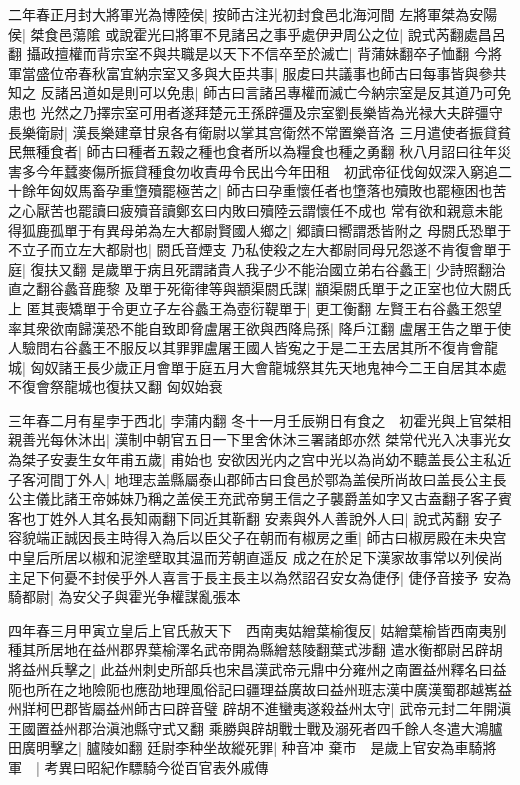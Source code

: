 二年春正月封大將軍光為博陸侯|{
	按師古注光初封食邑北海河間}
左將軍桀為安陽侯|{
	桀食邑蕩隂}
或說霍光曰將軍不見諸呂之事乎處伊尹周公之位|{
	說式芮翻處昌呂翻}
攝政擅權而背宗室不與共職是以天下不信卒至於滅亡|{
	背蒲妹翻卒子恤翻}
今將軍當盛位帝春秋富宜納宗室又多與大臣共事|{
	服䖍曰共議事也師古曰每事皆與參共知之}
反諸呂道如是則可以免患|{
	師古曰言諸呂專權而滅亡今納宗室是反其道乃可免患也}
光然之乃擇宗室可用者遂拜楚元王孫辟彊及宗室劉長樂皆為光禄大夫辟彊守長樂衛尉|{
	漢長樂建章甘泉各有衛尉以掌其宫衛然不常置樂音洛}
三月遣使者振貸貧民無種食者|{
	師古曰種者五穀之種也食者所以為糧食也種之勇翻}
秋八月詔曰往年災害多今年蠺麥傷所振貸種食勿收責毋令民出今年田租　初武帝征伐匈奴深入窮追二十餘年匈奴馬畜孕重墯殰罷極苦之|{
	師古曰孕重懷任者也墯落也殰敗也罷極困也苦之心厭苦也罷讀曰疲殰音讀鄭玄曰内敗曰殰陸云謂懷任不成也}
常有欲和親意未能得狐鹿孤單于有異母弟為左大都尉賢國人鄉之|{
	郷讀曰嚮謂悉皆附之}
母閼氏恐單于不立子而立左大都尉也|{
	閼氏音煙支}
乃私使殺之左大都尉同母兄怨遂不肯復會單于庭|{
	復扶又翻}
是歲單于病且死謂諸貴人我子少不能治國立弟右谷蠡王|{
	少詩照翻治直之翻谷蠡音鹿黎}
及單于死衛律等與顓渠閼氏謀|{
	顓渠閼氏單于之正室也位大閼氏上}
匿其喪矯單于令更立子左谷蠡王為壺衍鞮單于|{
	更工衡翻}
左賢王右谷蠡王怨望率其衆欲南歸漢恐不能自致即脅盧屠王欲與西降烏孫|{
	降戶江翻}
盧屠王告之單于使人驗問右谷蠡王不服反以其罪罪盧屠王國人皆寃之于是二王去居其所不復肯會龍城|{
	匈奴諸王長少歲正月會單于庭五月大會龍城祭其先天地鬼神今二王自居其本處不復會祭龍城也復扶又翻}
匈奴始衰

三年春二月有星孛于西北|{
	孛蒲内翻}
冬十一月壬辰朔日有食之　初霍光與上官桀相親善光每休沐出|{
	漢制中朝官五日一下里舍休沐三署諸郎亦然}
桀常代光入决事光女為桀子安妻生女年甫五歲|{
	甫始也}
安欲因光内之宫中光以為尚幼不聽盖長公主私近子客河間丁外人|{
	地理志盖縣屬泰山郡師古曰食邑於鄂為盖侯所尚故曰盖長公主長公主儀比諸王帝姊妹乃稱之盖侯王充武帝舅王信之子襲爵盖如字又古盍翻子客子賓客也丁姓外人其名長知兩翻下同近其靳翻}
安素與外人善說外人曰|{
	說式芮翻}
安子容貌端正誠因長主時得入為后以臣父子在朝而有椒房之重|{
	師古曰椒房殿在未央宫中皇后所居以椒和泥塗壁取其温而芳朝直遥反}
成之在於足下漢家故事常以列侯尚主足下何憂不封侯乎外人喜言于長主長主以為然詔召安女為倢伃|{
	倢伃音接予}
安為騎都尉|{
	為安父子與霍光争權謀亂張本}


四年春三月甲寅立皇后上官氏赦天下　西南夷姑繒葉榆復反|{
	姑繒葉榆皆西南夷别種其所居地在益州郡界葉榆澤名武帝開為縣繒慈陵翻葉式涉翻}
遣水衡都尉呂辟胡將益州兵擊之|{
	此益州刺史所部兵也宋昌漢武帝元鼎中分雍州之南置益州釋名曰益阨也所在之地險阨也應劭地理風俗記曰疆理益廣故曰益州班志漢中廣漢蜀郡越嶲益州牂柯巴郡皆屬益州師古曰辟音璧}
辟胡不進蠻夷遂殺益州太守|{
	武帝元封二年開滇王國置益州郡治滇池縣守式又翻}
乘勝與辟胡戰士戰及溺死者四千餘人冬遣大鴻臚田廣明擊之|{
	臚陵如翻}
廷尉李种坐故縱死罪|{
	种音冲}
棄市　是歲上官安為車騎將軍　|{
	考異曰昭紀作驃騎今從百官表外戚傳}


